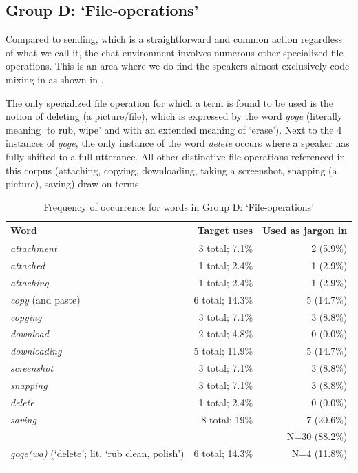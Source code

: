 \documentclass[output=paper
,newtxmath
,modfonts
,nonflat]{langsci/langscibook}
\begin{document}
\subsection{Group D: ‘File-operations’}

Compared to sending, which is a straightforward and common action regardless of what we call it, the chat environment involves numerous other specialized file operations. This is an area where we do find the  speakers almost exclusively code-mixing in  as shown in .  

The only specialized file operation for which a  term is found to be used is the notion of deleting (a picture/file), which is expressed by the word \textit{goge} (literally meaning ‘to rub, wipe’ and with an extended meaning of ‘erase’). Next to the 4 instances of \textit{goge}, the only instance of the  word \textit{delete} occurs where a speaker has fully shifted to a full  utterance. All other distinctive file operations referenced in this corpus (attaching, copying, downloading, taking a screenshot, snapping (a picture), saving) draw on  terms.

\begin{table}
\begin{tabularx}{\textwidth}{Qrr}
\lsptoprule
Word & Target uses  & Used as jargon in \\
\midrule
\textit{attachment}       & 3 total; 7.1\% & 2 (5.9\%)\\
\textit{attached}         & 1 total; 2.4\% & 1 (2.9\%)\\
\textit{attaching}        & 1 total; 2.4\% & 1 (2.9\%)\\
\textit{copy} (and paste) & 6 total; 14.3\% & 5 (14.7\%)\\
\textit{copying}          & 3 total; 7.1\% & 3 (8.8\%)\\
\textit{download}         & 2 total; 4.8\% & 0 (0.0\%)\\
\textit{downloading}      & 5 total; 11.9\% & 5 (14.7\%)\\
\textit{screenshot}       & 3 total; 7.1\% & 3 (8.8\%)\\
\textit{snapping}         & 3 total; 7.1\% & 3 (8.8\%)\\
\textit{delete}           & 1 total; 2.4\% & 0 (0.0\%)\\
\textit{saving}           & 8 total; 19\% & 7 (20.6\%)\\\midrule
& & N=30 (88.2\%)\\\midrule
\textit{goge(wa)} (‘delete’; lit. ‘rub clean, polish’) & 6 total; 14.3\% & N=4 (11.8\%)\\
\lspbottomrule
\end{tabularx}
\caption{Frequency of occurrence for words in Group D: ‘File-operations’}
\label{tab:purvis:6}
\end{table} 
\end{document}
